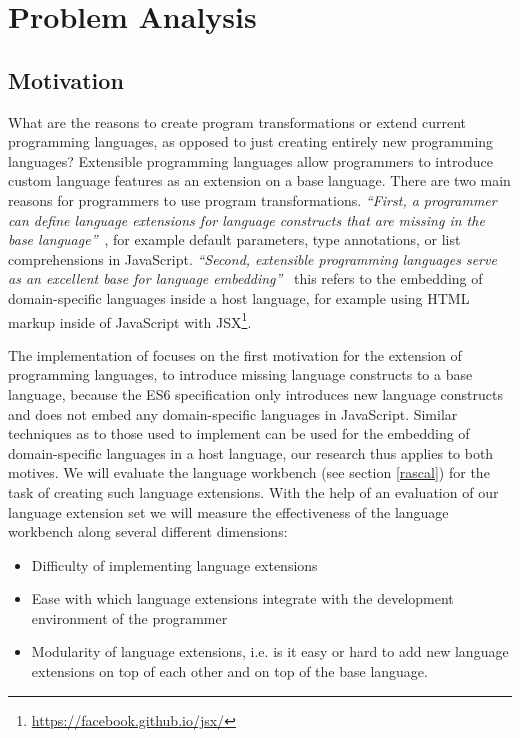 
\chapter{Problem Analysis} %

\label{Chapter2}


\section{Motivation}
What are the reasons to create program transformations or extend current programming languages, as opposed to just creating entirely new programming languages? Extensible programming languages allow programmers to introduce custom language features as an extension on a base language.  There are two main reasons for programmers to use program transformations. \textit{``First, a programmer can define language extensions for language constructs that are missing in the base language''}~\cite{Erdweg2014a}, for example default parameters, type annotations, or list comprehensions in JavaScript. \textit{``Second, extensible programming languages serve as an excellent base for language embedding''}~\cite{Erdweg2014a} this refers to the embedding of domain-specific languages inside a host language, for example using HTML markup inside of JavaScript with JSX\footnote{\url{https://facebook.github.io/jsx/}}.

The implementation of \projectname{} focuses on the first motivation for the extension of programming languages, to introduce missing language constructs to a base language, because the ES6 specification only introduces new language constructs and does not embed any domain-specific languages in JavaScript. Similar techniques as to those used to implement \projectname{} can be used for the embedding of domain-specific languages in a host language, our research thus applies to both motives. We will evaluate the language workbench (see section \ref{rascal}) for the task of creating such language extensions. With the help of an evaluation of our language extension set we will measure the effectiveness of the language workbench along several different dimensions:

\begin{itemize}
	\item Difficulty of implementing language extensions
	\item Ease with which language extensions integrate with the development environment of the programmer
	\item Modularity of language extensions, i.e. is it easy or hard to add new language extensions on top of each other and on top of the base language.
\end{itemize}


